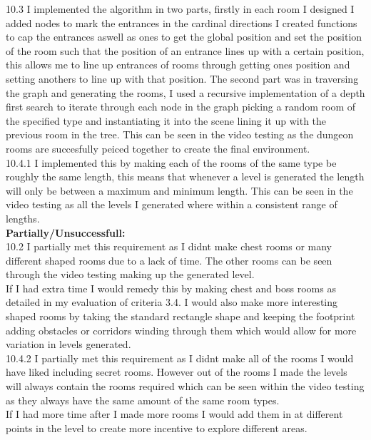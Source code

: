 \documentclass{article}
\begin{document}
        10.3 I implemented the algorithm in two parts, firstly in each room I designed I added nodes to mark the entrances in the cardinal directions I created functions to cap the entrances aswell as ones to get the global position and set the position of the room such that the position of an entrance lines up with a certain position, this allows me to line up entrances of rooms through getting ones position and setting anothers to line up with that position. The second part was in traversing the graph and generating the rooms, I used a recursive implementation of a depth first search to iterate through each node in the graph picking a random room of the specified type and instantiating it into the scene lining it up with the previous room in the tree. This can be seen in the video testing as the dungeon rooms are succesfully peiced together to create the final environment.\\
        10.4.1 I implemented this by making each of the rooms of the same type be roughly the same length, this means that whenever a level is generated the length will only be between a maximum and minimum length. This can be seen in the video testing as all the levels I generated where within a consistent range of lengths.\\
        \textbf{Partially/Unsuccessfull:}\\
        10.2 I partially met this requirement as I didnt make chest rooms or many different shaped rooms due to a lack of time. The other rooms can be seen through the video testing making up the generated level.\\
        If I had extra time I would remedy this by making chest and boss rooms as detailed in my evaluation of criteria 3.4. I would also make more interesting shaped rooms by taking the standard rectangle shape and keeping the footprint adding obstacles or corridors winding through them which would allow for more variation in levels generated.\\
        10.4.2 I partially met this requirement as I didnt make all of the rooms I would have liked including secret rooms. However out of the rooms I made the levels will always contain the rooms required which can be seen within the video testing as they always have the same amount of the same room types.\\
        If I had more time after I made more rooms I would add them in at different points in the level to create more incentive to explore different areas.\\
\end{document}

